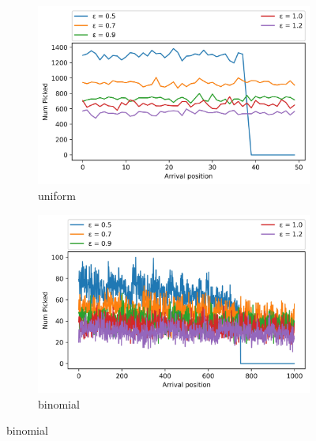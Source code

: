 \begin{figure}[ht]
  \begin{subfigure}[t]{.5\textwidth}
    \centering
    \includegraphics[width=\linewidth]{Images/extension/FairIIDProphet_uniform.jpeg}
    \caption{uniform}
    \label{fig:extension_fairIID_uniform}

  \end{subfigure}
  \hfill
  \begin{subfigure}[t]{.5\textwidth}
    \centering
    \includegraphics[width=\linewidth]{Images/extension/FairIIDProphet_binomial.jpeg}
    \caption{binomial}
    \label{fig:extension_fairIID_binomial}
  \end{subfigure}

  \medskip


\end{figure}
